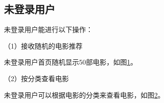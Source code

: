 \documentclass{bjfuthesis}
\begin{document}
\subsection{未登录用户}
未登录用户能进行以下操作：

\noindent （1）接收随机的电影推荐

未登录用户首页随机显示50部电影，如图\ref{fig:anonymous-index}。
\begin{figure}
	\label{fig:anonymous-index}
\end{figure}

\noindent （2）按分类查看电影

未登录用户可以根据电影的分类来查看电影，如图\ref{fig:anonymous-category}。
\begin{figure}
	\label{fig:anonymous-category}
\end{figure}
\end{document}
